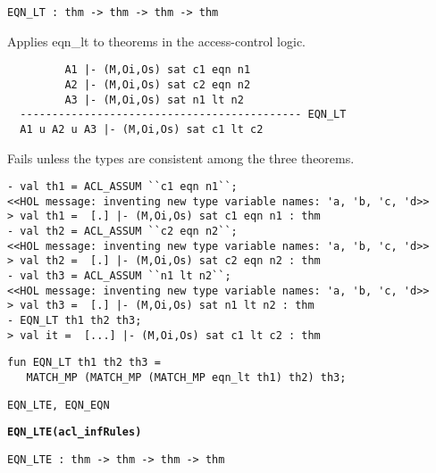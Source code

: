 \begin{verbatim}
EQN_LT : thm -> thm -> thm -> thm
\end{verbatim}

\SYNOPSIS
Applies eqn\_lt to theorems in the access-control logic.

\DESCRIBE
\begin{verbatim}
         A1 |- (M,Oi,Os) sat c1 eqn n1
         A2 |- (M,Oi,Os) sat c2 eqn n2  
         A3 |- (M,Oi,Os) sat n1 lt n2
  -------------------------------------------- EQN_LT
  A1 u A2 u A3 |- (M,Oi,Os) sat c1 lt c2
\end{verbatim}

\FAILURE Fails unless the types are consistent among the three
theorems.

\EXAMPLE
\begin{holboxed}
\begin{verbatim}
- val th1 = ACL_ASSUM ``c1 eqn n1``;
<<HOL message: inventing new type variable names: 'a, 'b, 'c, 'd>>
> val th1 =  [.] |- (M,Oi,Os) sat c1 eqn n1 : thm
- val th2 = ACL_ASSUM ``c2 eqn n2``;
<<HOL message: inventing new type variable names: 'a, 'b, 'c, 'd>>
> val th2 =  [.] |- (M,Oi,Os) sat c2 eqn n2 : thm
- val th3 = ACL_ASSUM ``n1 lt n2``;
<<HOL message: inventing new type variable names: 'a, 'b, 'c, 'd>>
> val th3 =  [.] |- (M,Oi,Os) sat n1 lt n2 : thm
- EQN_LT th1 th2 th3;
> val it =  [...] |- (M,Oi,Os) sat c1 lt c2 : thm
\end{verbatim}
\end{holboxed}

\IMPLEMENTATION
\begin{holboxed}
\begin{verbatim}
fun EQN_LT th1 th2 th3 =
   MATCH_MP (MATCH_MP (MATCH_MP eqn_lt th1) th2) th3;
\end{verbatim}
\end{holboxed}

\SEEALSO
\texttt{EQN\_LTE, EQN\_EQN}
\ENDDOC

\begin{holboxed}
  \begin{Large}
    \textbf{\texttt{EQN\_LTE}}\hfill{}\textbf{\texttt{(acl\_infRules)}}
  \end{Large}
\end{holboxed}
\begin{verbatim}
EQN_LTE : thm -> thm -> thm -> thm
\end{verbatim}

